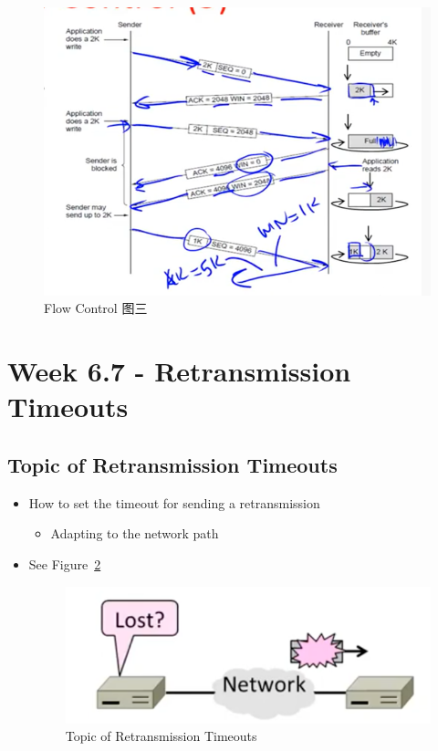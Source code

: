 \documentclass[12pt]{ctexart}   %
\begin{document}
\begin{itemize}
		 \begin{figure}[h!] %
		\centering
		 \includegraphics[scale=0.7]{images/6-6-9}
		\caption{ Flow Control 图三  }
		 \label{fig:6-6-9}
		 \end{figure}
	\end{itemize}
	
\section{Week 6.7 - Retransmission Timeouts}
	\subsection{Topic of Retransmission Timeouts}
	\begin{itemize}
		\item How to set the timeout for sending a retransmission
		\begin{itemize}
			\item Adapting to the network path
		\end{itemize}
		 \item See Figure~\ref{fig:6-7-1}
		  
		 \begin{figure}[h!] %
		\centering
		 \includegraphics[scale=0.7]{images/6-7-1}
		\caption{ Topic of Retransmission Timeouts  }
		 \label{fig:6-7-1}
		 \end{figure}
	\end{itemize}
	
\end{document}
